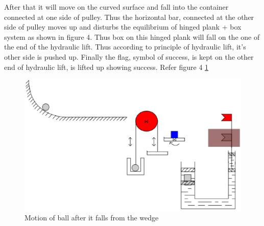 \documentclass[a4paper,11pt]{article}
\begin{document}
{\indent After that it will move on the curved surface and fall into the container connected at one side of pulley.  
\indent Thus the horizontal bar, connected at the other side of pulley moves up and disturbs the equilibrium of hinged plank + box system as shown in figure 4. Thus box on this hinged plank will fall on the one of the end of the hydraulic lift. Thus according to principle of hydraulic lift, it's other side is pushed up. Finally the flag, symbol of success, is kept on the other end of hydraulic lift, is lifted up showing success. Refer figure 4 \ref{fig:image3}
\begin{figure}[h]
    \centering
    \label{fig:image3}
    \includegraphics[scale=0.3]{image3}
    \caption{Motion of ball after it falls from the wedge}
\end{figure}

}

\newpage
\end{document}

